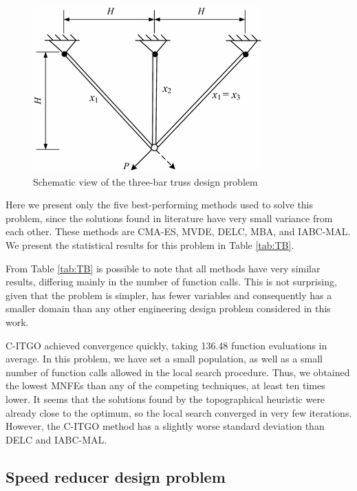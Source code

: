 \begin{figure}[h]
\begin{center}
\includegraphics[scale=0.5]{Imgs/TB.png}
\end{center}
\captionsetup{justification=centering}
\caption{Schematic view of the three-bar truss design problem}\label{fig:TB}
\end{figure}


Here we present only the five best-performing methods used to solve this problem, since the solutions found in literature have very small variance from each other. These methods are CMA-ES, MVDE, DELC, MBA, and IABC-MAL. We present the statistical results for this problem in Table \ref{tab:TB}.



From Table \ref{tab:TB} is possible to note that all methods have very similar results, differing mainly in the number of function calls. This is not surprising, given that the problem is simpler, has fewer variables and consequently has a smaller domain than any other engineering design problem considered in this work.

C-ITGO achieved convergence quickly, taking 136.48 function evaluations in average. In this problem, we have set a small population, as well as a small number of function calls allowed in the local search procedure. Thus, we obtained the lowest MNFEs than any of the competing techniques, at least ten times lower. It seems that the solutions found by the topographical heuristic were already close to the optimum, so the local search converged in very few iterations. However, the C-ITGO method has a slightly worse standard deviation than DELC and IABC-MAL.



\subsection{Speed reducer design problem}

